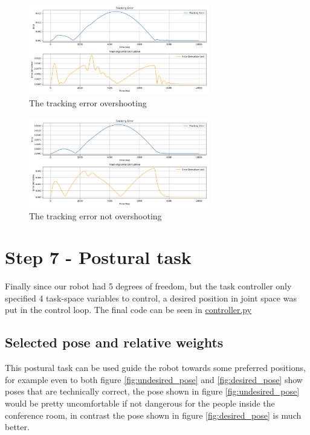 \documentclass[12pt,a4paper]{article}
\begin{document}
\begin{figure}[htbp]
    \centering
    \includegraphics[width=0.7\textwidth]{images/error_chart_overshoot.png}
    \caption{The tracking error overshooting}
    \label{fig:error_overshoot}
\end{figure}


\begin{figure}[htbp]
    \centering
    \includegraphics[width=0.7\textwidth]{images/error_chart_no_overshoot.png}
    \caption{The tracking error not overshooting}
    \label{fig:error_not_overshoot}
\end{figure}

\section{Step 7 - Postural task}
Finally since our robot had 5 degrees of freedom, but the task controller only 
specified 4 task-space variables to control, a desired position in joint space was put in
the control loop. The final code can be seen in
\href{https://github.com/lucaSartore/RobotArm/blob/master/src/robot_arm/src/data_processing/controller.py}{controller.py}

\subsection{Selected pose and relative weights}

This postural task can be used guide the robot towards some preferred positions, for example
even to both figure \ref{fig:undesired_pose} and \ref{fig:desired_pose} show poses that are technically
correct, the pose shown in figure \ref{fig:undesired_pose} would be pretty uncomfortable if not dangerous
for the people inside the conference room, in contrast the pose shown in figure \ref{fig:desired_pose}
is much better.
\end{document}
